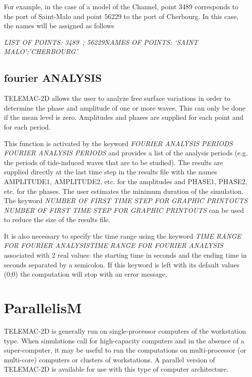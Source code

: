 \documentclass{article} %
\begin{document}
 For example, in the case of a model of the Channel, point 3489 corresponds to the port of Saint-Malo and point 56229 to the port of Cherbourg. In this case, the names will be assigned as follows

 \textit{LIST OF POINTS: 3489~; 56229NAMES OF POINTS: `SAINT MALO';'CHERBOURG'}


\subsection{ fourier ANALYSIS}

 TELEMAC-2D allows the user to analyze free surface variations in order to determine the phase and amplitude of one or more waves. This can only be done if the mean level is zero. Amplitudes and phases are supplied for each point and for each period.

 This function is activated by the keyword \textit{FOURIER ANALYSIS PERIODS} \textit{ FOURIER ANALYSIS  PERIODS} and provides a list of the analysis periods (e.g. the periods of tide-induced waves that are to be studied). The results are supplied directly at the last time step in the results file with the names AMPLITUDE1, AMPLITUDE2, etc. for the amplitudes and PHASE1, PHASE2, etc. for the phases. The user estimates the minimum duration of the simulation. The keyword \textit{NUMBER OF FIRST TIME STEP FOR GRAPHIC PRINTOUTS} \textit{NUMBER OF FIRST TIME STEP FOR GRAPHIC PRINTOUTS} can be used to reduce the size of the results file.

 It is also necessary to specify the time range using the keyword \textit{TIME RANGE FOR FOURIER ANALYSISTIME RANGE FOR FOURIER ANALYSIS} associated with 2 real values: the starting time in seconds and the ending time in seconds separated by a semicolon. If this keyword is left with its default values (0;0) the computation will stop with an error message.




\section{  ParallelisM}

 TELEMAC-2D is generally run on single-processor computers of the workstation type. When simulations call for high-capacity computers and in the absence of a super-computer, it may be useful to run the computations on multi-processor (or multi-core) computers or clusters of workstations. A parallel version of TELEMAC-2D is available for use with this type of computer architecture.
\end{document}
